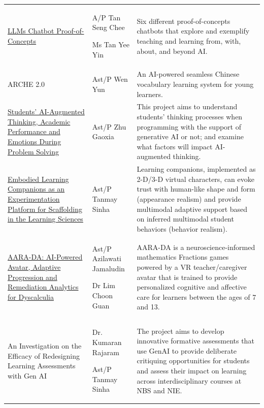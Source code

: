 \documentclass[english]{textolivre}
\begin{document}
\begin{small}
\begin{longtable}{>{\raggedright\arraybackslash}p{3.2cm}
                  >{\raggedright\arraybackslash}p{2.8cm}
                  >{\raggedright\arraybackslash}p{7.5cm}}
\href{https://www.canva.com/design/DAGEqaxYY_Y/ill1ZYKdIKqkP4YJQoSPLA/edit}{LLMs Chatbot Proof-of-Concepts}
&
A/P Tan Seng Chee

Ms Tan Yee Yin
&
Six different proof-of-concepts chatbots that explore and exemplify teaching and learning from, with, about, and beyond AI.
\\

ARCHE 2.0
&
Ast/P Wen Yun
&
An AI-powered seamless Chinese vocabulary learning system for young learners.
\\

\href{https://www.ntu.edu.sg/nie/aied/thinking-students'-ai-augmented-thinking}{Students' AI-Augmented Thinking, Academic Performance and Emotions During Problem Solving}
&
Ast/P Zhu Gaoxia
&
This project aims to understand students' thinking processes when programming with the support of generative AI or not; and examine what factors will impact AI-augmented thinking.
\\
\href{https://www.ntu.edu.sg/nie/aied/embodied-learning-companions}{Embodied Learning Companions as an Experimentation Platform for Scaffolding in the Learning Sciences}
&
Ast/P Tanmay Sinha
&
Learning companions, implemented as 2-D/3-D virtual characters, can evoke trust with human-like shape and form (appearance realism) and provide multimodal adaptive support based on inferred multimodal student behaviors (behavior realism).
\\

\href{https://forms.office.com/pages/responsepage.aspx?id=SJPOFSq-K0aPwOF2WpsgSlA8cUiAHXFHgasz6DS5w9dUMkI4RzBLTURDRlgwRkQxTzVHUk9WQUJQTi4u&route=shorturl}{AARA-DA: AI-Powered Avatar, Adaptive Progression and Remediation Analytics for Dyscalculia}
&
Ast/P Azilawati Jamaludin

Dr Lim Choon Guan
&
AARA-DA is a neuroscience-informed mathematics Fractions games powered by a VR teacher/caregiver avatar that is trained to provide personalized cognitive and affective care for learners between the ages of 7 and 13.
\\

An Investigation on the Efficacy of Redesigning Learning Assessments with Gen AI
&
Dr. Kumaran Rajaram

Ast/P Tanmay Sinha
&
The project aims to develop innovative formative assessments that use GenAI to provide deliberate critiquing opportunities for students and assess their impact on learning across interdisciplinary courses at NBS and NIE.
\\


\end{longtable}
\end{small}
\end{document}
